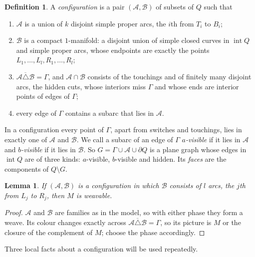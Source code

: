 \documentclass[11pt,a4paper]{article}
\newtheorem{lemma}[theorem]{Lemma}
\theoremstyle{definition}
\newtheorem{definition}[theorem]{Definition}
\theoremstyle{remark}
\newcommand{\A}{\mathcal{A}}
\newcommand{\B}{\mathcal{B}}
\newcommand{\intr}{\operatorname{int}}
\newcommand{\bd}{\partial}
\begin{document}
\begin{definition}\label{def:config}
A \emph{configuration} is a pair $(\A,\B)$ of subsets of $Q$ such that
\begin{enumerate}[label=\textup{(C\arabic*)}]
\item $\A$ is a union of $k$ disjoint simple proper arcs, the $i$th from
  $T_i$ to $B_i$;
\item $\B$ is a compact $1$-manifold: a disjoint union of simple closed
  curves in $\intr Q$ and simple proper arcs, whose endpoints are exactly
  the points $L_1,\dots,L_l,R_1,\dots,R_l$;
\item $\overline{\A\triangle\B}=\Gamma$, and $\A\cap\B$ consists of the
  touchings and of finitely many disjoint arcs, the hidden cuts, whose
  interiors miss $\Gamma$ and whose ends are interior points of edges of
  $\Gamma$;
\item every edge of $\Gamma$ contains a subarc that lies in $\A$.
\end{enumerate}
\end{definition}

In a configuration every point of $\Gamma$, apart from switches and
touchings, lies in exactly one of $\A$ and $\B$. We call a subarc of an edge
of $\Gamma$ \emph{$a$-visible} if it lies in $\A$ and \emph{$b$-visible} if
it lies in $\B$. So $G=\Gamma\cup\A\cup\bd Q$ is a plane graph whose edges
in $\intr Q$ are of three kinds: $a$-visible, $b$-visible and hidden. Its
\emph{faces} are the components of $Q\setminus G$.

\begin{lemma}\label{lem:done}
If $(\A,\B)$ is a configuration in which $\B$ consists of $l$ arcs, the
$j$th from $L_j$ to $R_j$, then $M$ is weavable.
\end{lemma}
\begin{proof}
$\A$ and $\B$ are families as in the model, so with either phase they form
a weave. Its colour changes exactly across
$\overline{\A\triangle\B}=\Gamma$, so its picture is $M$ or the closure of
the complement of $M$; choose the phase accordingly.
\end{proof}

Three local facts about a configuration will be used repeatedly.
\end{document}
